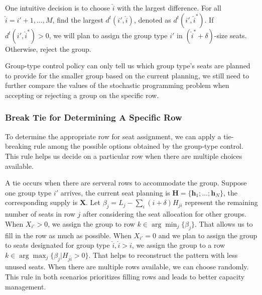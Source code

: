 One intuitive decision is to choose $\hat{i}$ with the largest difference. For all $\hat{i} = {i{'}}+1, \ldots, M$, find the largest $d^{t}({i{'}},\hat{i})$, denoted as $d^{t}({i{'}},\hat{i}^{*})$. If $d^{t}({i{'}},\hat{i}^{*}) >0$, we will plan to assign the group type ${i{'}}$ in $(\hat{i}^{*}+\delta)$-size seats. Otherwise, reject the group.

Group-type control policy can only tell us which group type's seats are planned to provide for the smaller group based on the current planning, we still need to further compare the values of the stochastic programming problem when accepting or rejecting a group on the specific row. 


\subsubsection{Break Tie for Determining A Specific Row}\label{tie-break}

To determine the appropriate row for seat assignment, we can apply a tie-breaking rule among the possible options obtained by the group-type control. This rule helps us decide on a particular row when there are multiple choices available. 

A tie occurs when there are serveral rows to accommodate the group. Suppose one group type ${i{'}}$ arrives, the current seat planning is $\bm{H} = \{\bm{h}_{1}; \ldots; \bm{h}_{N}\}$, the corresponding supply is $\bm{X}$. Let $\beta_{j} = L_j - \sum_{i} (i+\delta) H_{ji}$ represent the remaining number of seats in row $j$ after considering the seat allocation for other groups. When $X_{{i{'}}} > 0$, we assign the group to row $k \in \arg \min_{j} \{\beta_{j}\}$. That allows us to fill in the row as much as possible. When $X_{{i{'}}} = 0$ and we plan to assign the group to seats designated for group type $\hat{i}, \hat{i}>i$, we assign the group to a row $k \in \arg \max_{j} \{\beta_{j}| H_{j \hat{i}}>0\}$. That helps to reconstruct the pattern with less unused seats. When there are multiple rows available, we can choose randomly. This rule in both scenarios prioritizes filling rows and leads to better capacity management.


